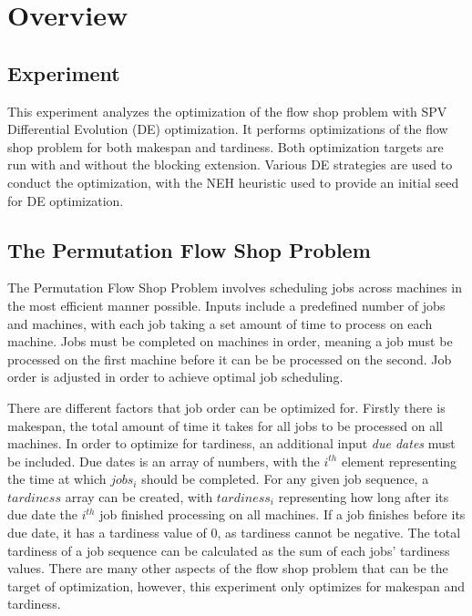 \documentclass{article}
\begin{document}
\clearpage


\section{Overview}

\subsection{Experiment}

This experiment analyzes the optimization of the flow shop problem with SPV Differential Evolution (DE) optimization. It performs optimizations of the flow shop problem for both makespan and tardiness. Both optimization targets are run with and without the blocking extension. Various DE strategies are used to conduct the optimization, with the NEH heuristic used to provide an initial seed for DE optimization. 

\subsection{The Permutation Flow Shop Problem}

The Permutation Flow Shop Problem involves scheduling jobs across machines in the most efficient manner possible. Inputs include a predefined number of jobs and machines, with each job taking a set amount of time to process on each machine. Jobs must be completed on machines in order, meaning a job must be processed on the first machine before it can be be processed on the second. Job order is adjusted in order to achieve optimal job scheduling. 

There are different factors that job order can be optimized for. Firstly there is makespan, the total amount of time it takes for all jobs to be processed on all machines. In order to optimize for tardiness, an additional input \textit{due dates} must be included. Due dates is an array of numbers, with the ${i^{th}}$ element representing the time at which $jobs_i$ should be completed. For any given job sequence, a $tardiness$ array can be created, with $tardiness_i$ representing how long after its due date the $i^{th}$ job finished processing on all machines. If a job finishes before its due date, it has a tardiness value of $0$, as tardiness cannot be negative. The total tardiness of a job sequence can be calculated as the sum of each jobs' tardiness values. There are many other aspects of the flow shop problem that can be the target of optimization, however, this experiment only optimizes for makespan and tardiness.
\end{document}
